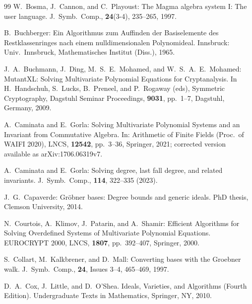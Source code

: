 \documentclass{article}
\theoremstyle{definition}
\theoremstyle{plain}
\theoremstyle{plain}
\theoremstyle{plain}
\theoremstyle{plain}
\numberwithin{equation}{subsection}
\begin{document}
\begin{thebibliography}{99}
W.\ Bosma, J.\ Cannon, and C.\ Playoust:
The Magma algebra system I: The user language.
J.\ Symb.\ Comp., {\bf 24}(3-4), 235--265, 1997.

B.\ Buchberger:
Ein Algorithmus zum Auffinden der Basiselemente des Restklassenringes nach einem nulldimensionalen Polynomideal.
Innsbruck: Univ.\ Innsbruck, Mathematisches Institut (Diss.), 1965.

J.\ A.\ Buchmann, J.\ Ding, M.\ S.\ E.\ Mohamed, and W.\ S.\ A.\ E.\ Mohamed:
MutantXL: Solving Multivariate Polynomial Equations for Cryptanalysis.
In H.\ Handschuh, S.\ Lucks, B.\ Preneel, and P.\ Rogaway (eds), Symmetric Cryptography, Dagstuhl Seminar Proceedings, {\bf 9031}, pp.\ 1--7, Dagstuhl, Germany, 2009.

A.\ Caminata and E.\ Gorla:
Solving Multivariate Polynomial Systems and an Invariant from Commutative Algebra.
In: Arithmetic of Finite Fields (Proc.\ of WAIFI 2020), LNCS, {\bf 12542}, pp.\ 3--36, Springer, 2021;
corrected version available as arXiv:1706.06319v7.

A.\ Caminata and E.\ Gorla:
Solving degree, last fall degree, and related invariants.
J.\ Symb.\ Comp., {\bf 114}, 322--335 (2023).



J.\ G.\ Capaverde:
Gr\"{o}bner bases: Degree bounds and generic ideals.
PhD thesis, Clemson University, 2014.

N.\ Courtois, A.\ Klimov, J.\ Patarin, and A.\ Shamir:
Efficient Algorithms for Solving Overdefined Systems of Multivariate Polynomial Equations.
EUROCRYPT 2000, LNCS, {\bf 1807}, pp.\ 392--407, Springer, 2000.

S.\ Collart, M.\ Kalkbrener, and D.\ Mall:
Converting bases with the Groebner walk.
J.\ Symb.\ Comp., {\bf 24}, Issues 3--4, 465--469, 1997.

D.\ A.\ Cox, J.\ Little, and D.\ O'Shea.
Ideals, Varieties, and Algorithms (Fourth Edition). 
Undergraduate Texts in Mathematics, Springer, NY, 2010. 


\end{thebibliography}
\end{document}
